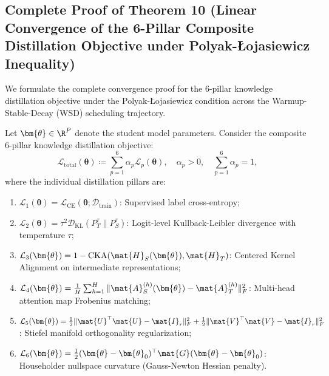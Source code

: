 \subsection{Complete Proof of Theorem 10 (Linear Convergence of the 6-Pillar Composite Distillation Objective under Polyak-\L{}ojasiewicz Inequality)}
\label{sec:appendix_a10_thm10}

We formulate the complete convergence proof for the 6-pillar knowledge distillation objective under the Polyak-\L{}ojasiewicz condition across the Warmup-Stable-Decay (WSD) scheduling trajectory.

\begin{theorem}
\label{thm:linear_kd_convergence}
Let $\bm{\theta} \in \R^P$ denote the student model parameters. Consider the composite 6-pillar knowledge distillation objective:
\begin{equation}
\mathcal{L}_{\text{total}}(\bm{\theta}) \coloneqq \sum_{p=1}^6 \alpha_p \mathcal{L}_p(\bm{\theta}), \quad \alpha_p > 0, \quad \sum_{p=1}^6 \alpha_p = 1,
\label{eq:composite_6pillar_loss_def}
\end{equation}
where the individual distillation pillars are:
\begin{enumerate}
    \item $\mathcal{L}_1(\bm{\theta}) = \mathcal{L}_{\text{CE}}(\bm{\theta}; \mathcal{D}_{\text{train}})$: Supervised label cross-entropy;
    \item $\mathcal{L}_2(\bm{\theta}) = \tau^2 \mathcal{D}_{\text{KL}}(P_T^\tau \| P_S^\tau)$: Logit-level Kullback-Leibler divergence with temperature $\tau$;
    \item $\mathcal{L}_3(\bm{\theta}) = 1 - \operatorname{CKA}(\mat{H}_S(\bm{\theta}), \mat{H}_T)$: Centered Kernel Alignment on intermediate representations;
    \item $\mathcal{L}_4(\bm{\theta}) = \frac{1}{H} \sum_{h=1}^H \|\mat{A}_S^{(h)}(\bm{\theta}) - \mat{A}_T^{(h)}\|_F^2$: Multi-head attention map Frobenius matching;
    \item $\mathcal{L}_5(\bm{\theta}) = \frac{1}{2}\|\mat{U}^\top \mat{U} - \mat{I}_r\|_F^2 + \frac{1}{2}\|\mat{V}^\top \mat{V} - \mat{I}_r\|_F^2$: Stiefel manifold orthogonality regularization;
    \item $\mathcal{L}_6(\bm{\theta}) = \frac{1}{2} (\bm{\theta} - \bm{\theta}_0)^\top \mat{G} (\bm{\theta} - \bm{\theta}_0)$: Householder nullspace curvature (Gauss-Newton Hessian penalty).
\end{enumerate}


\end{theorem}
